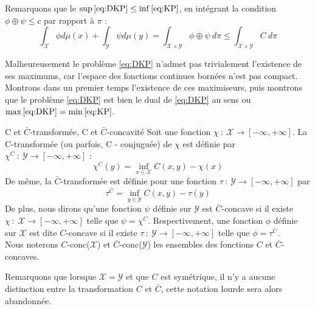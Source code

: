 \documentclass[a4paper,12pt]{article}
\begin{document}
\vspace{0.3cm}

Remarquons que le $\sup\eqref{eq:DKP} \leq \inf\eqref{eq:KP}$, en intégrant la condition $\phi\oplus\psi \leq c$ par rapport à $\pi$ : 
$$
\int_{\mathcal{X}} \phi d\mu (x) + \int_{\mathcal{Y}}\psi d\mu(y) = \int_{\mathcal{X}\times\mathcal{Y}} \phi\oplus\psi\ d\pi \leq \int_{\mathcal{X}\times\mathcal{Y}} C\ d\pi
$$

Malheureusement le problème \eqref{eq:DKP} n'admet pas trivialement l'existence de ses maximums, car l'espace des fonctions continues bornées n'est pas compact. Montrons dans un premier temps l'existence de ces maximiseurs, puis montrons que le problème \eqref{eq:DKP} est bien le dual de \eqref{eq:DKP} au sens ou $\max\eqref{eq:DKP} =\min\eqref{eq:KP}$.
\newpage

\begin{definition}{C et $\bar{C}$-transformée, C et $\bar{C}$-concavité}
Soit une fonction $\chi\ :\ \mathcal{X}\rightarrow [-\infty,+\infty]$. La C-transformée (ou parfois, C - conjuguée) de $\chi$ est définie par $\chi^C\ : \ \mathcal{Y}\rightarrow[-\infty,+\infty]$ : 
$$
\chi^C(y)=\inf_{x\in\mathcal{X}} C(x,y) -\chi(x)
$$
De même, la $\bar{C}$-transformée est définie pour une fonction $\tau\ :\ \mathcal{Y}\rightarrow [-\infty,+\infty]$ par 
$$
\tau^{\bar{C}} = \inf_{y\in\mathcal{Y}} C(x,y) -\tau(y)
$$
De plus, nous dirons qu'une fonction $\psi$ définie sur $\mathcal{Y}$ est $\bar{C}$-concave si il existe $\chi\ :\ \mathcal{X}\rightarrow [-\infty,+\infty]$ telle que $\psi = \chi^C$. Respectivement, une fonction $\phi$ définie sur $\mathcal{X}$ est dite $C$-concave si il existe $\tau\ :\ \mathcal{Y}\rightarrow [-\infty,+\infty]$ telle que $\phi=\tau^{\bar{C}}$. \\
Nous noterons $C$-conc($\mathcal{X}$) et $\bar{C}$-conc($\mathcal{Y}$) les ensembles des fonctions $C$ et $\bar{C}$-concaves. 
\end{definition}
Remarquons que lorsque $\mathcal{X}=\mathcal{Y}$ et que $C$ est symétrique, il n'y a aucune distinction entre la transformation $C$ et $\bar{C}$, cette notation lourde sera alors abandonnée. \\
\end{document}
